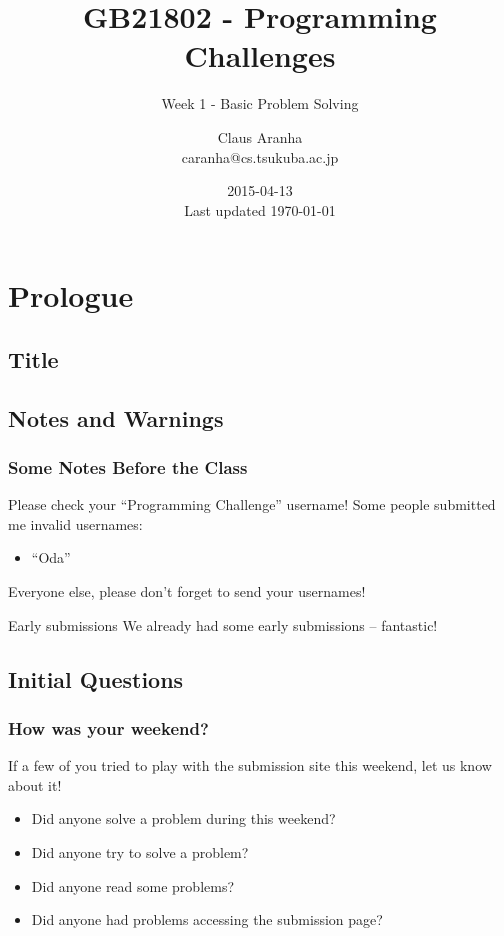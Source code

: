 \documentclass{beamer}
\title[GB21802]{GB21802 - Programming Challenges}
\subtitle[]{Week 1 - Basic Problem Solving}
\author[Claus Aranha]{Claus Aranha\\{\footnotesize caranha@cs.tsukuba.ac.jp}}
\institute{College of Information Science}
\date{2015-04-13\\{\tiny Last updated \today}}
\begin{document}
\section{Prologue}
\subsection{Title}
\begin{frame}
\maketitle
\end{frame}

\subsection{Notes and Warnings}

\begin{frame}
  \frametitle{Some Notes Before the Class}
  \begin{block}{Please check your ``Programming Challenge'' username!}
    Some people submitted me invalid usernames:
    \begin{itemize}
    \item ``Oda''
    \end{itemize}
    Everyone else, please don't forget to send your usernames!
  \end{block}

  \begin{block}{Early submissions}
    We already had some early submissions -- fantastic!
  \end{block}
\end{frame}



\subsection{Initial Questions}
\begin{frame}
  \frametitle{How was your weekend?}  

  If a few of you tried to play with the submission site this weekend,
  let us know about it!

  \bigskip

  \begin{itemize}
    \item Did anyone solve a problem during this weekend?
    \item<2-> Did anyone try to solve a problem?
    \item<3-> Did anyone read some problems?
    \item<4-> Did anyone had problems accessing the submission page?
  \end{itemize}
\end{frame}
\end{document}
